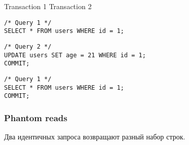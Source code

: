 \begin{minipage}{.5\linewidth}
\hfil Transaction 1 \hfil   \hfil Transaction 2 \hfil

\begin{flushleft}\begin{minipage}{.6\textwidth}
\begin{verbatim}
/* Query 1 */
SELECT * FROM users WHERE id = 1;
\end{verbatim}
\end{minipage}\end{flushleft}

\begin{flushright}\begin{minipage}{.6\textwidth}
\begin{verbatim}
/* Query 2 */
UPDATE users SET age = 21 WHERE id = 1;
COMMIT;
\end{verbatim}
\end{minipage}
\end{flushright}

\begin{flushleft}\begin{minipage}{.6\textwidth}
\begin{verbatim}
/* Query 1 */
SELECT * FROM users WHERE id = 1;
COMMIT;
\end{verbatim}
\end{minipage}\end{flushleft}
\end{minipage}

\subsubsection{Phantom reads}
Два идентичных запроса возвращают разный набор строк.


